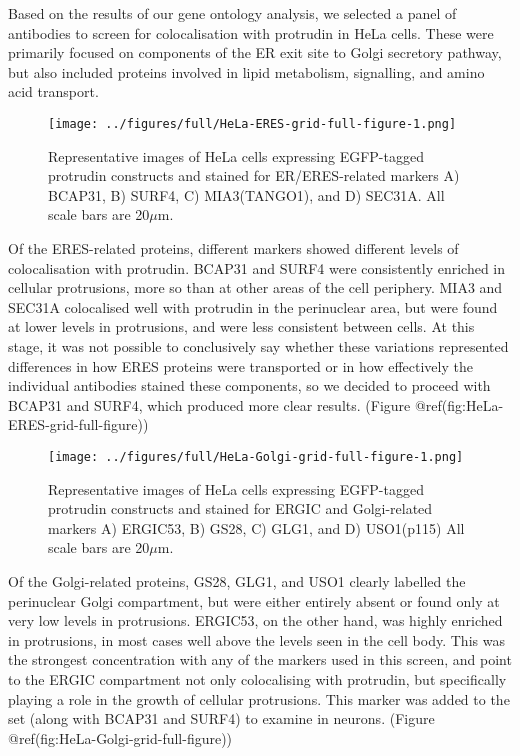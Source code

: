 \documentclass[
  12pt,
  a4paper,
]{article}
\begin{document}
Based on the results of our gene ontology analysis, we selected a panel
of antibodies to screen for colocalisation with protrudin in HeLa cells.
These were primarily focused on components of the ER exit site to Golgi
secretory pathway, but also included proteins involved in lipid
metabolism, signalling, and amino acid transport.

\begin{figure}
\centering
\texttt{[image: ../figures/full/HeLa-ERES-grid-full-figure-1.png]}
\caption{Representative images of HeLa cells expressing EGFP-tagged
protrudin constructs and stained for ER/ERES-related markers A) BCAP31,
B) SURF4, C) MIA3(TANGO1), and D) SEC31A. All scale bars are
20\(\mu\)m.}
\end{figure}

Of the ERES-related proteins, different markers showed different levels
of colocalisation with protrudin. BCAP31 and SURF4 were consistently
enriched in cellular protrusions, more so than at other areas of the
cell periphery. MIA3 and SEC31A colocalised well with protrudin in the
perinuclear area, but were found at lower levels in protrusions, and
were less consistent between cells. At this stage, it was not possible
to conclusively say whether these variations represented differences in
how ERES proteins were transported or in how effectively the individual
antibodies stained these components, so we decided to proceed with
BCAP31 and SURF4, which produced more clear results. (Figure
@ref(fig:HeLa-ERES-grid-full-figure))

\begin{figure}
\centering
\texttt{[image: ../figures/full/HeLa-Golgi-grid-full-figure-1.png]}
\caption{Representative images of HeLa cells expressing EGFP-tagged
protrudin constructs and stained for ERGIC and Golgi-related markers A)
ERGIC53, B) GS28, C) GLG1, and D) USO1(p115) All scale bars are
20\(\mu\)m.}
\end{figure}

Of the Golgi-related proteins, GS28, GLG1, and USO1 clearly labelled the
perinuclear Golgi compartment, but were either entirely absent or found
only at very low levels in protrusions. ERGIC53, on the other hand, was
highly enriched in protrusions, in most cases well above the levels seen
in the cell body. This was the strongest concentration with any of the
markers used in this screen, and point to the ERGIC compartment not only
colocalising with protrudin, but specifically playing a role in the
growth of cellular protrusions. This marker was added to the set (along
with BCAP31 and SURF4) to examine in neurons. (Figure
@ref(fig:HeLa-Golgi-grid-full-figure))
\end{document}
